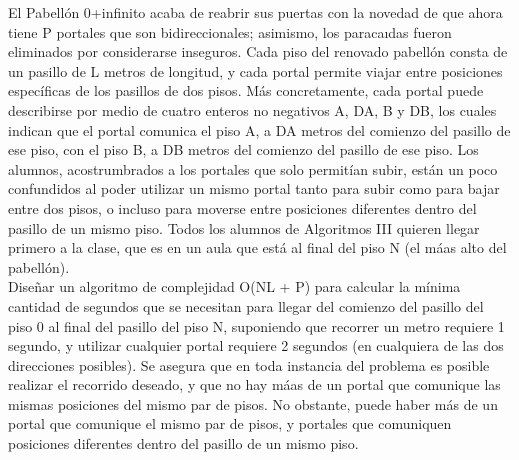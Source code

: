 El Pabell\'on 0+infinito acaba de reabrir sus puertas con la novedad de que ahora tiene P portales que
son bidireccionales; asimismo, los paracaıdas fueron eliminados por considerarse inseguros. Cada piso
del renovado pabell\'on consta de un pasillo de L metros de longitud, y cada portal permite viajar entre
posiciones espec\'ificas de los pasillos de dos pisos. M\'as concretamente, cada portal puede describirse por
medio de cuatro enteros no negativos A, DA, B y DB, los cuales indican que el portal comunica el
piso A, a DA metros del comienzo del pasillo de ese piso, con el piso B, a DB metros del comienzo
del pasillo de ese piso. Los alumnos, acostrumbrados a los portales que solo permitían subir, están un
poco confundidos al poder utilizar un mismo portal tanto para subir como para bajar entre dos pisos, o
incluso para moverse entre posiciones diferentes dentro del pasillo de un mismo piso. Todos los alumnos
de Algoritmos III quieren llegar primero a la clase, que es en un aula que está al final del piso N (el máas
alto del pabellón). \\
Diseñar un algoritmo de complejidad O(NL + P) para calcular la mínima cantidad
de segundos que se necesitan para llegar del comienzo del pasillo del piso 0 al final del pasillo del piso
N, suponiendo que recorrer un metro requiere 1 segundo, y utilizar cualquier portal requiere 2 segundos
(en cualquiera de las dos direcciones posibles). Se asegura que en toda instancia del problema es posible
realizar el recorrido deseado, y que no hay máas de un portal que comunique las mismas posiciones del
mismo par de pisos. No obstante, puede haber más de un portal que comunique el mismo par de pisos,
y portales que comuniquen posiciones diferentes dentro del pasillo de un mismo piso.